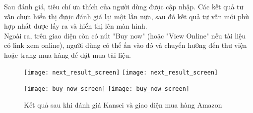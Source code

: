 \pagebreak

 Sau đánh giá, tiêu chí ưa thích của người dùng được cập nhập. Các kết quả tư vấn chưa hiển thị được đánh giá lại một lần nữa, sau đó kết quả tư vấn mới phù hợp nhất được lấy ra và hiển thị lên màn hình. \\

Ngoài ra, trên giao diện còn có nút "Buy now" (hoặc "View Online" nếu tài liệu có link xem online), người dùng có thể ấn vào đó và chuyển hướng đến thư viện hoặc trang mua hàng để đặt mua tài liệu. \\    

\begin{figure}[H]
  \begin{minipage}[b]{0.50\linewidth}
  	\centering
      \ifpdf
      \texttt{[image: next\_result\_screen]}
    \else
      \texttt{[image: next\_result\_screen]}
    \fi  	
  \end{minipage}
    \begin{minipage}[b]{0.50\linewidth}
  	\centering
      \ifpdf
      \texttt{[image: buy\_now\_screen]}
    \else
      \texttt{[image: buy\_now\_screen]}
    \fi  	
  \end{minipage}
    \caption{Kết quả sau khi đánh giá Kansei và giao diện mua hàng Amazon}
    \label{RecommendedResultScreen}
\end{figure}

